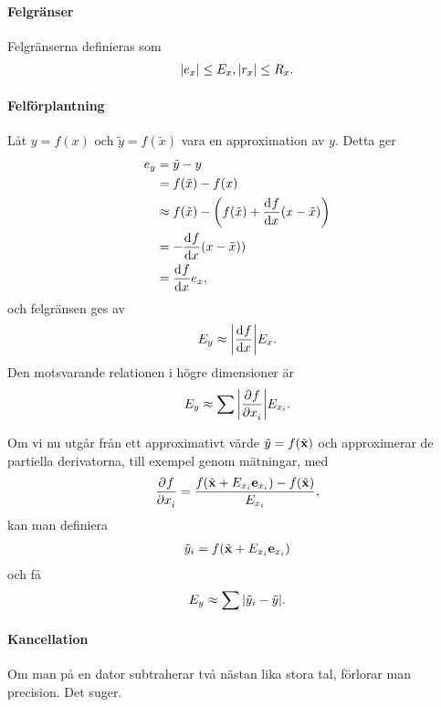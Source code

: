 \paragraph{Felgränser}
Felgränserna definieras som
\begin{align*}
	\abs{e_{x}} \leq E_{x}, \abs{r_{x}} \leq R_{x}.
\end{align*}

\paragraph{Felförplantning}
Låt $y = f(x)$ och $\tilde{y} = f(\tilde{x})$ vara en approximation av $y$. Detta ger
\begin{align*}
	e_{y} &= \tilde{y} - y \\
	      &= f(\tilde{x}) - f(x) \\
	      &\approx f(\tilde{x}) - \left(f(\tilde{x}) + \dv[]{f}{x} (\tilde{x})(x - \tilde{x})\right) \\
	      &= -\dv[]{f}{x} (\tilde{x})(x - \tilde{x})) \\
	      &= \dv[]{f}{x} (\tilde{x})e_{x},
\end{align*}
och felgränsen ges av
\begin{align*}
	E_{y} \approx \abs{\dv[]{f}{x} (\tilde{x})}E_{x}.
\end{align*}
Den motsvarande relationen i högre dimensioner är
\begin{align*}
	E_{y} \approx \sum\abs{\pdv[]{f}{x_{i}} (\tilde{\vb{x}})}E_{x_{i}}.
\end{align*}

Om vi nu utgår från ett approximativt värde $\tilde{y} = f(\tilde{\vb{x}})$ och approximerar de partiella derivatorna, till exempel genom mätningar, med
\begin{align*}
	\pdv[]{f}{x_{i}} (\tilde{\vb{x}}) = \frac{f(\tilde{\vb{x}} + E_{x_{i}}\vb{e}_{x_{i}}) - f(\tilde{\vb{x}})}{E_{x_{i}}},
\end{align*}
kan man definiera
\begin{align*}
	\tilde{y}_{i} = f(\tilde{\vb{x}} + E_{x_{i}}\vb{e}_{x_{i}})
\end{align*}
och få
\begin{align*}
	E_{y} \approx \sum\abs{\tilde{y}_{i} - \tilde{y}}.
\end{align*}

\paragraph{Kancellation}
Om man på en dator subtraherar två nästan lika stora tal, förlorar man precision. Det suger.


